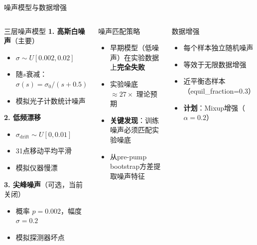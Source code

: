 \documentclass[aspectratio=169,9pt]{beamer}
\begin{document}
\begin{frame}{噪声模型与数据增强}
  \begin{columns}[T]
    \begin{block}{三层噪声模型}
      \scriptsize
      \textbf{1. 高斯白噪声}（主要）
      \begin{itemize}
        \item $\sigma \sim U[0.002, 0.02]$
        \item 随$s$衰减：$\sigma(s) = \sigma_0 / (s + 0.5)$
        \item 模拟光子计数统计噪声
      \end{itemize}

      \textbf{2. 低频漂移}
      \begin{itemize}
        \item $\sigma_{\text{drift}} \sim U[0, 0.01]$
        \item 31点移动平均平滑
        \item 模拟仪器慢漂
      \end{itemize}

      \textbf{3. 尖峰噪声}（可选，当前关闭）
      \begin{itemize}
        \item 概率 $p = 0.002$，幅度 $\sigma = 0.2$
        \item 模拟探测器坏点
      \end{itemize}
    \end{block}

    \begin{block}{噪声匹配策略}
      \scriptsize
      \begin{itemize}
        \item 早期模型（低噪声）在实验数据上\textbf{完全失败}
        \item 实验噪底 $\approx 27\times$ 理论预期
        \item \textbf{关键发现}：训练噪声必须匹配实验噪底
        \item 从pre-pump bootstrap方差提取噪声特征
      \end{itemize}
    \end{block}

    \begin{exampleblock}{数据增强}
      \scriptsize
      \begin{itemize}
        \item 每个样本独立随机噪声
        \item 等效于无限数据增强
        \item 近平衡态样本（equil\_fraction=0.3）
        \item \textbf{计划}：Mixup增强（$\alpha=0.2$）
      \end{itemize}
    \end{exampleblock}
  \end{columns}
\end{frame}
\end{document}
